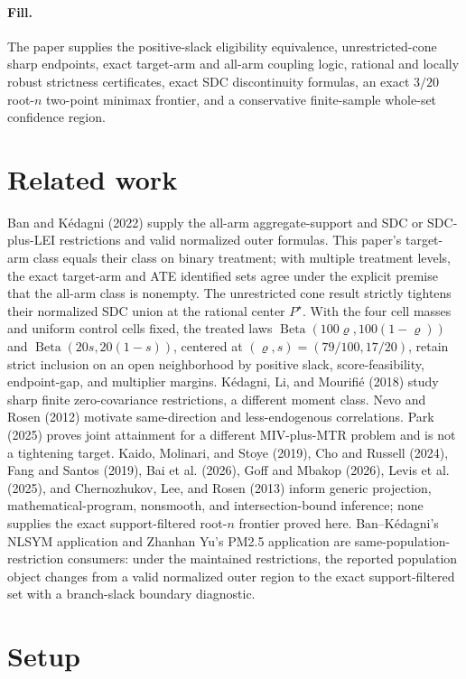 \documentclass{article}
\begin{document}
\paragraph{Fill.} The paper supplies the positive-slack eligibility equivalence, unrestricted-cone sharp endpoints, exact target-arm and all-arm coupling logic, rational and locally robust strictness certificates, exact SDC discontinuity formulas, an exact \(3/20\) root-\(n\) two-point minimax frontier, and a conservative finite-sample whole-set confidence region.

\section{Related work}

Ban and Kédagni (2022) supply the all-arm aggregate-support and SDC or SDC-plus-LEI restrictions and valid normalized outer formulas. This paper's target-arm class equals their class on binary treatment; with multiple treatment levels, the exact target-arm and ATE identified sets agree under the explicit premise that the all-arm class is nonempty. The unrestricted cone result strictly tightens their normalized SDC union at the rational center \(P^\star\). With the four cell masses and uniform control cells fixed, the treated laws \(\operatorname{Beta}(100\varrho,100(1-\varrho))\) and \(\operatorname{Beta}(20s,20(1-s))\), centered at \((\varrho,s)=(79/100,17/20)\), retain strict inclusion on an open neighborhood by positive slack, score-feasibility, endpoint-gap, and multiplier margins. Kédagni, Li, and Mourifié (2018) study sharp finite zero-covariance restrictions, a different moment class. Nevo and Rosen (2012) motivate same-direction and less-endogenous correlations. Park (2025) proves joint attainment for a different MIV-plus-MTR problem and is not a tightening target. Kaido, Molinari, and Stoye (2019), Cho and Russell (2024), Fang and Santos (2019), Bai et al. (2026), Goff and Mbakop (2026), Levis et al. (2025), and Chernozhukov, Lee, and Rosen (2013) inform generic projection, mathematical-program, nonsmooth, and intersection-bound inference; none supplies the exact support-filtered root-\(n\) frontier proved here. Ban--Kédagni's NLSYM application and Zhanhan Yu's PM2.5 application are same-population-restriction consumers: under the maintained restrictions, the reported population object changes from a valid normalized outer region to the exact support-filtered set with a branch-slack boundary diagnostic.

\section{Setup}
\end{document}
